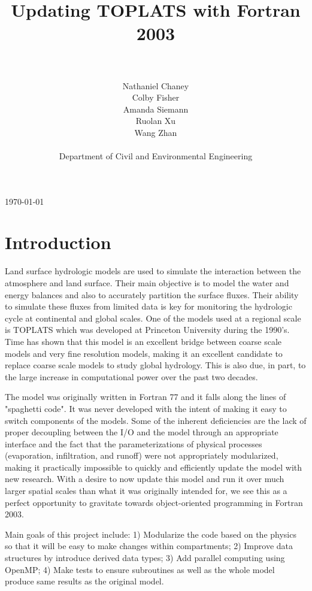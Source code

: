 \documentclass[pdftex,12pt,a4paper]{article}
\title{Updating TOPLATS with Fortran 2003}
\author{\\ \\ Nathaniel Chaney\\ Colby Fisher\\ Amanda Siemann\\ Ruolan Xu\\ Wang Zhan \\ \\ Department of Civil and Environmental Engineering}
\date{}
\begin{document}
\maketitle
\vfill
\begin{center}
{\large \today}
\end{center}

\newpage

\section{Introduction}
Land surface hydrologic models are used to simulate the interaction between the atmosphere and land surface. Their main objective is to model the water and energy balances and also to accurately partition the surface fluxes. Their ability to simulate these fluxes from limited data is key for monitoring the hydrologic cycle at continental and global scales. One of the models used at a regional scale is TOPLATS which was developed at Princeton University during the 1990's. Time has shown that this model is an excellent bridge between coarse scale models and very fine resolution models, making it an excellent candidate to replace coarse scale models to study global hydrology. This is also due, in part, to the large increase in computational power over the past two decades. 

The model was originally written in Fortran 77 and it falls along the lines of "spaghetti code". It was never developed with the intent of making it easy to switch components of the models. Some of the inherent deficiencies are the lack of proper decoupling between the I/O and the model through an appropriate interface and the fact that the parameterizations of physical processes (evaporation, infiltration, and runoff) were not appropriately modularized, making it practically impossible to quickly and efficiently update the model with new research. With a desire to now update this model and run it over much larger spatial scales than what it was originally intended for, we see this as a perfect opportunity to gravitate towards object-oriented programming in Fortran 2003. 

Main goals of this project include: 1) Modularize the code based on the physics so that it will be easy to make changes within compartments; 2) Improve data structures by introduce derived data types; 3) Add parallel computing using OpenMP; 4) Make tests to ensure subroutines as well as the whole model produce same results as the original model. 
\end{document}
